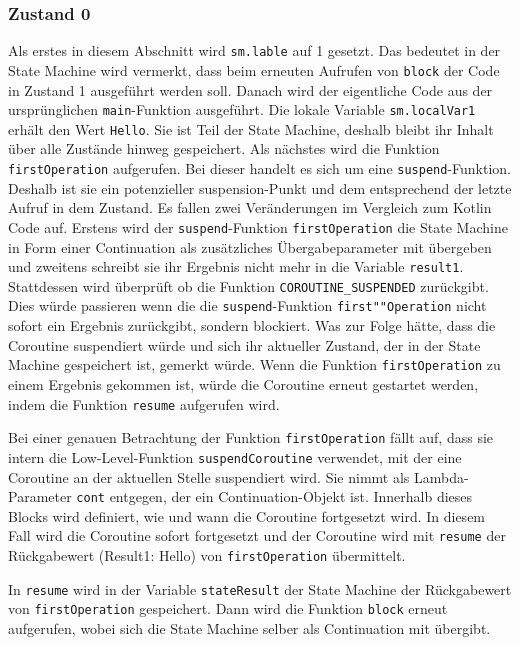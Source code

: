 \documentclass[fontsize=12pt,paper=a4,twoside=semi,parskip=half-,headsepline,headinclude]{scrreprt}
\begin{document}
\subsubsection{Zustand 0}

Als erstes in diesem Abschnitt wird \texttt{sm.lable} auf 1 gesetzt. Das bedeutet in der State Machine wird vermerkt, dass beim erneuten Aufrufen von \texttt{block} der Code in Zustand 1 ausgeführt werden soll. Danach wird der eigentliche Code aus der ursprünglichen \texttt{main}-Funktion ausgeführt. Die lokale Variable \texttt{sm.localVar1} erhält den Wert \texttt{Hello}. Sie ist Teil der State Machine, deshalb bleibt ihr Inhalt über alle Zustände hinweg gespeichert. Als nächstes wird die Funktion \texttt{firstOperation} aufgerufen. Bei dieser handelt es sich um eine \texttt{suspend}-Funktion. Deshalb ist sie ein potenzieller suspension-Punkt und dem entsprechend der letzte Aufruf in dem Zustand. Es fallen zwei Veränderungen im Vergleich zum Kotlin Code auf. Erstens wird der \texttt{suspend}-Funktion \texttt{firstOperation} die State Machine in Form einer Continuation als zusätzliches Übergabeparameter mit übergeben und zweitens schreibt sie ihr Ergebnis nicht mehr in die Variable \texttt{result1}. Stattdessen wird überprüft ob die Funktion \texttt{COROUTINE\_SUSPENDED} zurückgibt\cite{Akhin2024}. Dies würde passieren wenn die die \texttt{suspend}-Funktion \texttt{first""Operation} nicht sofort ein Ergebnis zurückgibt, sondern blockiert. Was zur Folge hätte, dass die Coroutine suspendiert würde und sich ihr aktueller Zustand, der in der State Machine gespeichert ist, gemerkt würde. Wenn die Funktion \texttt{firstOperation} zu einem Ergebnis gekommen ist, würde die Coroutine erneut gestartet werden, indem die Funktion \texttt{resume} aufgerufen wird.

Bei einer genauen Betrachtung der Funktion \texttt{firstOperation} fällt auf, dass sie intern die Low-Level-Funktion \texttt{suspendCoroutine} verwendet, mit der eine Coroutine an der aktuellen Stelle suspendiert wird. Sie nimmt als Lambda-Parameter \texttt{cont} entgegen, der ein Continuation-Objekt ist. Innerhalb dieses Blocks wird definiert, wie und wann die Coroutine fortgesetzt wird. In diesem Fall wird die Coroutine sofort fortgesetzt und der Coroutine wird mit \texttt{resume} der Rückgabewert (Result1: Hello) von \texttt{firstOperation} übermittelt.

In \texttt{resume} wird in der Variable \texttt{stateResult} der State Machine der Rückgabewert von \texttt{firstOperation} gespeichert. Dann wird die Funktion \texttt{block} erneut aufgerufen, wobei sich die State Machine selber als Continuation mit übergibt.
\end{document}
